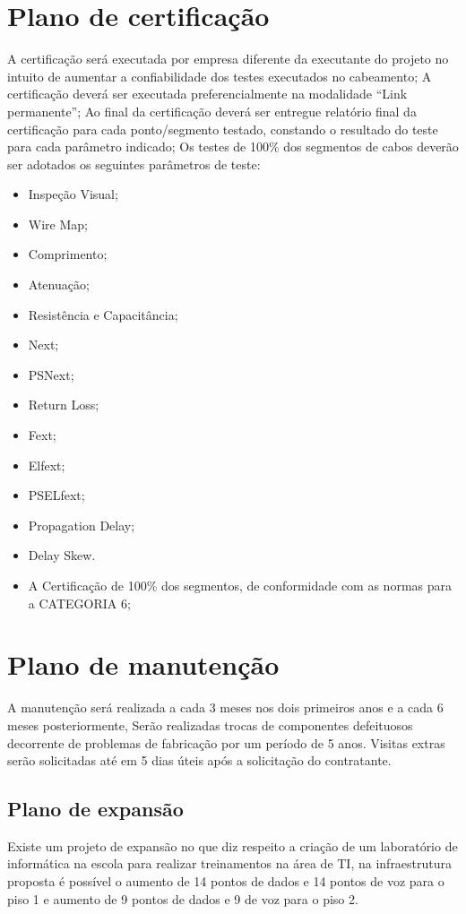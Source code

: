 \documentclass[	DIV=calc,%
							paper=a4,%
							fontsize=12pt,%
							onecolumn]{scrartcl}	 					%
\begin{document}
\section{Plano de certificação}
A certificação será executada por empresa diferente da executante do projeto no intuito de aumentar a confiabilidade dos testes executados no cabeamento;\newline
A certificação deverá ser executada preferencialmente na modalidade “Link permanente”;\newline
Ao final da certificação deverá ser entregue relatório final da certificação para cada ponto/segmento testado, constando o resultado do teste para cada parâmetro indicado;\newline
Os testes de 100\% dos segmentos de cabos deverão ser adotados os seguintes parâmetros de teste:\newline
\begin{itemize}
	\item Inspeção Visual; 
	\item Wire Map; 
	\item Comprimento; 
	\item Atenuação; 
	\item Resistência e Capacitância; 
	\item Next;
	\item PSNext; 
	\item Return Loss; 
	\item Fext; 
	\item Elfext; 
	\item PSELfext; 
	\item Propagation Delay; 
	\item Delay Skew. 
	\item  A Certificação de 100\% dos segmentos, de conformidade com as normas para a CATEGORIA 6;
\end{itemize}
\section{Plano de manutenção}

A manutenção será realizada a cada 3 meses nos dois primeiros anos e a cada 6 meses posteriormente, Serão realizadas trocas de componentes defeituosos decorrente de problemas de fabricação por um período de 5 anos. Visitas extras serão solicitadas até em 5 dias úteis após a solicitação do contratante.

\subsection{Plano de expansão}
Existe um projeto de expansão no que diz respeito a criação de um laboratório de informática na escola para realizar treinamentos na área de TI, na infraestrutura proposta é possível o aumento de 14 pontos de dados e 14 pontos de voz para o piso 1 e aumento de 9 pontos de dados e 9 de voz para o piso 2.
\end{document}
